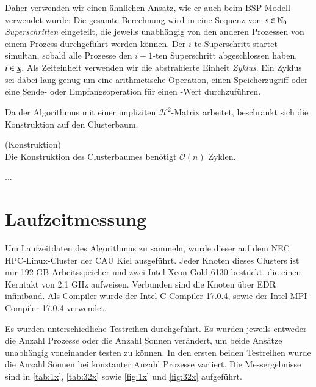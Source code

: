   Daher verwenden wir einen ähnlichen Ansatz, wie er auch beim BSP-Modell \citep{bsp} verwendet wurde: Die gesamte Berechnung wird in eine Sequenz von $s \in \mathbb{N}_0$ \textit{Superschritten} eingeteilt,
  die jeweils unabhängig von den anderen Prozessen von einem Prozess durchgeführt werden können. Der $i$-te Superschritt startet simultan, sobald alle Prozesse den $i-1$-ten Superschritt abgeschlossen
  haben, $i \in \haken{s}$. Als Zeiteinheit verwenden wir die abstrahierte Einheit \textit{Zyklus}. Ein Zyklus sei dabei lang genug um eine arithmetische Operation, einen Speicherzugriff oder eine Sende-
  oder Empfangsoperation für einen -Wert durchzuführen.
  
  Da der Algorithmus mit einer impliziten $\mathcal{H}^2$-Matrix arbeitet, beschränkt sich die Konstruktion auf den Clusterbaum.
  
  \begin{lem}
    (Konstruktion)\\
    Die Konstruktion des Clusterbaumes benötigt $\mathcal{O}(n)$ Zyklen.
  \end{lem}
  
  ...
  
  \section{Laufzeitmessung}
  Um Laufzeitdaten des Algorithmus zu sammeln, wurde dieser auf dem NEC HPC-Linux-Cluster der CAU Kiel ausgeführt. Jeder Knoten dieses Clusters ist mir 192 GB Arbeitsspeicher und zwei Intel Xeon Gold 
  6130 bestückt, die einen Kerntakt von 2,1 GHz aufweisen. Verbunden sind die Knoten über EDR infiniband. Als Compiler wurde der Intel-C-Compiler 17.0.4, sowie der Intel-MPI-Compiler 17.0.4 verwendet.
  
  Es wurden unterschiedliche Testreihen durchgeführt. Es wurden jeweils entweder die Anzahl Prozesse oder die Anzahl Sonnen verändert, um beide Ansätze unabhängig voneinander testen zu können.
  In den ersten beiden Testreihen wurde die Anzahl Sonnen bei konstanter Anzahl Prozesse variiert. Die Messergebnisse sind in \autoref{tab:1x}, \autoref{tab:32x} sowie \autoref{fig:1x} und 
  \autoref{fig:32x} aufgeführt.
  
  
  
  \blindtext
